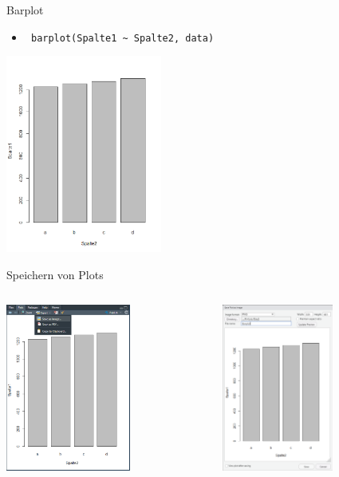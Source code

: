 \documentclass[xcolor=dvipsnames, aspectratio = 169]{beamer}
\begin{document}
\begin{frame}[fragile]{Barplot}
	\begin{itemize}
		\item \verb+ barplot(Spalte1 ~ Spalte2, data) +
	\end{itemize}
			
	\begin{center}
		\includegraphics[height=6.5cm]{Barplot}
	\end{center}
\end{frame}

\begin{frame}[fragile]{Speichern von Plots}
	\begin{columns}[T]
		\begin{column}{0.5\textwidth}
			\begin{center}
				\includegraphics[height=5.5cm]{SaveImage}
			\end{center}
		\end{column}
		\begin{column}{0.5\textwidth}
			\begin{center}
				\includegraphics[height=5.5cm]{SaveImage2}
			\end{center}
		\end{column}
	\end{columns}	
\end{frame}
\end{document}
